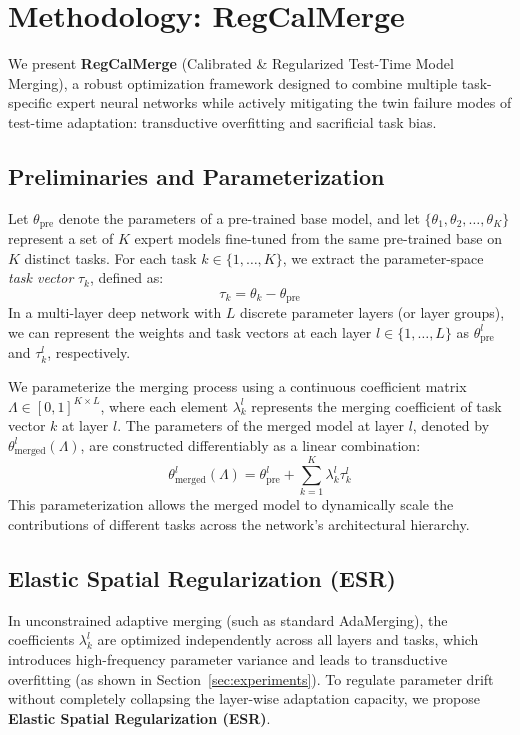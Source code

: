 \section{Methodology: RegCalMerge}
\label{sec:methodology}

We present \textbf{RegCalMerge} (Calibrated \& Regularized Test-Time Model Merging), a robust optimization framework designed to combine multiple task-specific expert neural networks while actively mitigating the twin failure modes of test-time adaptation: transductive overfitting and sacrificial task bias.

\subsection{Preliminaries and Parameterization}
Let $\theta_{\text{pre}}$ denote the parameters of a pre-trained base model, and let $\{\theta_1, \theta_2, \dots, \theta_K\}$ represent a set of $K$ expert models fine-tuned from the same pre-trained base on $K$ distinct tasks. For each task $k \in \{1, \dots, K\}$, we extract the parameter-space \emph{task vector} $\tau_k$, defined as:
\begin{equation}
\tau_k = \theta_k - \theta_{\text{pre}}
\end{equation}
In a multi-layer deep network with $L$ discrete parameter layers (or layer groups), we can represent the weights and task vectors at each layer $l \in \{1, \dots, L\}$ as $\theta^l_{\text{pre}}$ and $\tau^l_k$, respectively.

We parameterize the merging process using a continuous coefficient matrix $\Lambda \in [0, 1]^{K \times L}$, where each element $\lambda^l_k$ represents the merging coefficient of task vector $k$ at layer $l$. The parameters of the merged model at layer $l$, denoted by $\theta^l_{\text{merged}}(\Lambda)$, are constructed differentiably as a linear combination:
\begin{equation}
\label{eq:merged_params}
\theta^l_{\text{merged}}(\Lambda) = \theta^l_{\text{pre}} + \sum_{k=1}^K \lambda^l_k \tau^l_k
\end{equation}
This parameterization allows the merged model to dynamically scale the contributions of different tasks across the network's architectural hierarchy.

\subsection{Elastic Spatial Regularization (ESR)}
In unconstrained adaptive merging (such as standard AdaMerging), the coefficients $\lambda^l_k$ are optimized independently across all layers and tasks, which introduces high-frequency parameter variance and leads to transductive overfitting (as shown in Section~\ref{sec:experiments}). To regulate parameter drift without completely collapsing the layer-wise adaptation capacity, we propose \textbf{Elastic Spatial Regularization (ESR)}. 

